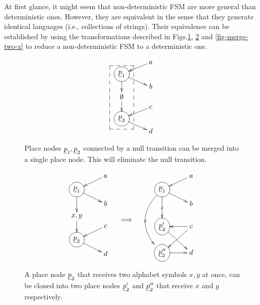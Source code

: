 At first glance, it might
seem that non-deterministic FSM
are more general than  deterministic ones.
However, they are equivalent
in the sense that they generate identical languages (i.e., collections of strings). Their equivalence can be
established by using the transformations described in Figs.\ref{fig-shrink-null-tra},
\ref{fig-split-x-y}
and \ref{fig-merge-two-x}
to reduce  a non-deterministic FSM
to a deterministic one.


\begin{figure}[h!]
$$
\xymatrix@R=.1pc{
& a\ar[dl]
\\
\Circle{\rvp_1}\ar[rd]
\ar[dd]
\\
& b
\\
\emptyset\ar[dd]
\\
&c\ar[dl]
\\
\Circle{\rvp_2}\ar[rd]
\\
&d
\save "2,1"."6,1"*++[F--]\frm{}
\restore
}
$$
\caption{Place nodes $\rvp_1, \rvp_2$ connected by
a null transition can be merged into a single
place node. This will eliminate the null transition.}
\label{fig-shrink-null-tra}
\end{figure}

\begin{figure}[h!]
$$
\begin{array}{ccc}
\xymatrix@R=.3pc{
& a\ar[dl]
\\
\Circle{\rvp_1}\ar[rd]
\ar[dd]
\\
& b
\\
x,y\ar[dd]
\\
&c\ar[dl]
\\
\Circle{\rvp_2}\ar[rd]
\\
&d
}
&
\xymatrix
{
\\
\\
\implies}
&
\xymatrix@R=.3pc{
& a\ar[dl]
\\
\Circle{\rvp_1}\ar[rd]
\ar[ddd]|x
\ar@/_2pc/[ddddd]|y
\\
& b
\\
\\
\Circle{\rvp_2'}\ar[rdd]
&c\ar[ldd]\ar[l]
\\
\\
\Circle{\rvp_2''}\ar[r]
&d
}
\end{array}
$$
\caption{A place node $\rvp_2$
that receives two alphabet 
symbols $x, y$ at once, 
can be cloned into two place nodes
$\rvp_2'$ and $\rvp_2''$ that receive
 $x$ and $y$ respectively.
}
\label{fig-split-x-y}
\end{figure}


